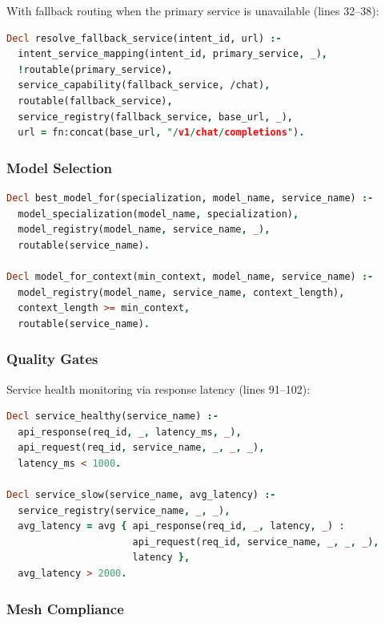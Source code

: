 \documentclass[11pt]{article}
\begin{document}
With fallback routing when the primary service is unavailable (lines 32--38):

\begin{lstlisting}[language=Prolog,caption={Fallback routing (rules.mg:32--38)}]
Decl resolve_fallback_service(intent_id, url) :-
  intent_service_mapping(intent_id, primary_service, _),
  !routable(primary_service),
  service_capability(fallback_service, /chat),
  routable(fallback_service),
  service_registry(fallback_service, base_url, _),
  url = fn:concat(base_url, "/v1/chat/completions").
\end{lstlisting}

\subsubsection{Model Selection}

\begin{lstlisting}[language=Prolog,caption={Model selection rules (rules.mg:109--118)}]
Decl best_model_for(specialization, model_name, service_name) :-
  model_specialization(model_name, specialization),
  model_registry(model_name, service_name, _),
  routable(service_name).

Decl model_for_context(min_context, model_name, service_name) :-
  model_registry(model_name, service_name, context_length),
  context_length >= min_context,
  routable(service_name).
\end{lstlisting}

\subsubsection{Quality Gates}

Service health monitoring via response latency (lines 91--102):

\begin{lstlisting}[language=Prolog,caption={Health quality gates (rules.mg:91--102)}]
Decl service_healthy(service_name) :-
  api_response(req_id, _, latency_ms, _),
  api_request(req_id, service_name, _, _, _),
  latency_ms < 1000.

Decl service_slow(service_name, avg_latency) :-
  service_registry(service_name, _, _),
  avg_latency = avg { api_response(req_id, _, latency, _) :
                      api_request(req_id, service_name, _, _, _),
                      latency },
  avg_latency > 2000.
\end{lstlisting}

\subsubsection{Mesh Compliance}
\end{document}

